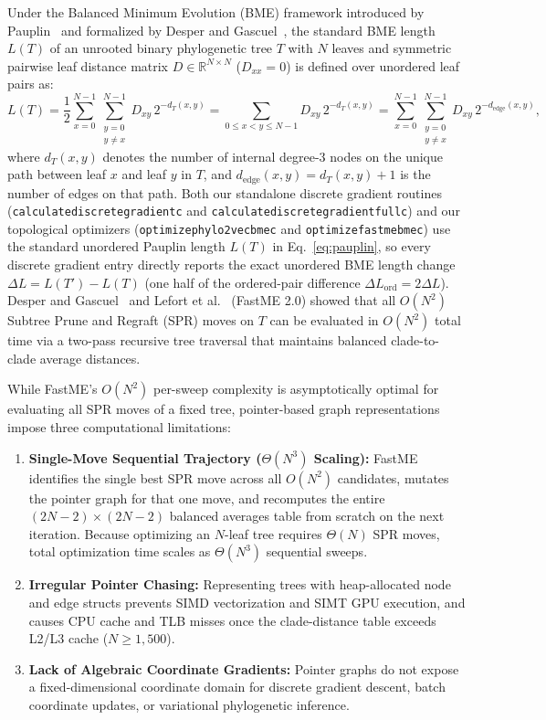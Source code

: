 \documentclass[11pt,a4paper]{article}
\makeatletter
\DeclareRobustCommand{\_}{\ifmmode\nfss@text{\textunderscore}\else\textunderscore\allowbreak\fi}
\theoremstyle{definition}
\makeatother
\begin{document}
Under the Balanced Minimum Evolution (BME) framework introduced by Pauplin~\cite{pauplin2000direct} and formalized by Desper and Gascuel~\cite{desper2002fast}, the standard BME length $L(T)$ of an unrooted binary phylogenetic tree $T$ with $N$ leaves and symmetric pairwise leaf distance matrix $D \in \mathbb{R}^{N \times N}$ ($D_{xx} = 0$) is defined over unordered leaf pairs as:
\begin{equation}
L(T) = \frac{1}{2} \sum_{x=0}^{N-1} \sum_{\substack{y=0 \\ y \neq x}}^{N-1} D_{xy} \, 2^{-d_T(x, y)} = \sum_{0 \le x < y \le N-1} D_{xy} \, 2^{-d_T(x, y)} = \sum_{x=0}^{N-1} \sum_{\substack{y=0 \\ y \neq x}}^{N-1} D_{xy} \, 2^{-d_{\text{edge}}(x, y)},
\label{eq:pauplin}
\end{equation}
where $d_T(x, y)$ denotes the number of internal degree-3 nodes on the unique path between leaf $x$ and leaf $y$ in $T$, and $d_{\text{edge}}(x, y) = d_T(x, y) + 1$ is the number of edges on that path. Both our standalone discrete gradient routines (\texttt{calculate\_discrete\_gradient\_c} and \texttt{calculate\_discrete\_gradient\_full\_c}) and our topological optimizers (\texttt{optimize\_phylo2vec\_bme\_c} and \texttt{optimize\_fastme\_bme\_c}) use the standard unordered Pauplin length $L(T)$ in Eq.~\eqref{eq:pauplin}, so every discrete gradient entry directly reports the exact unordered BME length change $\Delta L = L(T') - L(T)$ (one half of the ordered-pair difference $\Delta L_{\text{ord}} = 2 \Delta L$). Desper and Gascuel~\cite{desper2002fast} and Lefort et al.~\cite{lefort2015fastme} (FastME 2.0) showed that all $O(N^2)$ Subtree Prune and Regraft (SPR) moves on $T$ can be evaluated in $O(N^2)$ total time via a two-pass recursive tree traversal that maintains balanced clade-to-clade average distances.

While FastME's $O(N^2)$ per-sweep complexity is asymptotically optimal for evaluating all SPR moves of a fixed tree, pointer-based graph representations impose three computational limitations:
\begin{enumerate}
    \item \textbf{Single-Move Sequential Trajectory ($\Theta(N^3)$ Scaling):} FastME identifies the single best SPR move across all $O(N^2)$ candidates, mutates the pointer graph for that one move, and recomputes the entire $(2N-2) \times (2N-2)$ balanced averages table from scratch on the next iteration. Because optimizing an $N$-leaf tree requires $\Theta(N)$ SPR moves, total optimization time scales as $\Theta(N^3)$ sequential sweeps.
    \item \textbf{Irregular Pointer Chasing:} Representing trees with heap-allocated node and edge structs prevents SIMD vectorization and SIMT GPU execution, and causes CPU cache and TLB misses once the clade-distance table exceeds L2/L3 cache ($N \ge 1{,}500$).
    \item \textbf{Lack of Algebraic Coordinate Gradients:} Pointer graphs do not expose a fixed-dimensional coordinate domain for discrete gradient descent, batch coordinate updates, or variational phylogenetic inference.
\end{enumerate}
\end{document}
